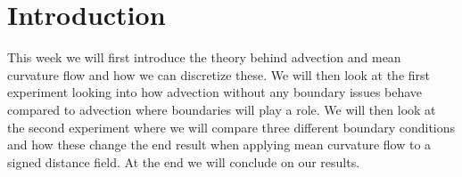 \section{Introduction}
This week we will first introduce the theory behind advection and mean curvature flow and how we can discretize these. We will then look at the first experiment looking into how advection without any boundary issues behave compared to advection where boundaries will play a role. We will then look at the second experiment where we will compare three different boundary conditions and how these change the end result when applying mean curvature flow to a signed distance field. At the end we will conclude on our results.